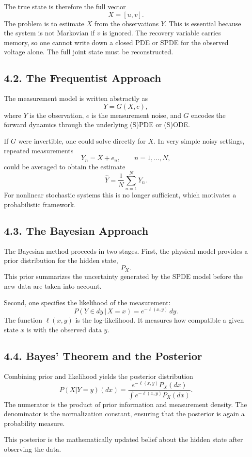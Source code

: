 \documentclass[11pt]{article}
\theoremstyle{definition}
\theoremstyle{remark}
\begin{document}
The true state is therefore the full vector
\[
X=[u,v].
\]
The problem is to estimate \(X\) from the observations \(Y\). This is essential because the system is not Markovian if \(v\) is ignored. The recovery variable carries memory, so one cannot write down a closed PDE or SPDE for the observed voltage alone. The full joint state must be reconstructed.

\subsection*{4.2. The Frequentist Approach}
The measurement model is written abstractly as
\[
Y=G(X,e),
\]
where \(Y\) is the observation, \(e\) is the measurement noise, and \(G\) encodes the forward dynamics through the underlying (S)PDE or (S)ODE.

If \(G\) were invertible, one could solve directly for \(X\). In very simple noisy settings, repeated measurements
\[
Y_n=X+e_n,
\qquad n=1,\dots,N,
\]
could be averaged to obtain the estimate
\[
\widehat Y=\frac1N\sum_{n=1}^N Y_n.
\]
For nonlinear stochastic systems this is no longer sufficient, which motivates a probabilistic framework.

\subsection*{4.3. The Bayesian Approach}
The Bayesian method proceeds in two stages. First, the physical model provides a prior distribution for the hidden state,
\[
P_X.
\]
This prior summarizes the uncertainty generated by the SPDE model before the new data are taken into account.

Second, one specifies the likelihood of the measurement:
\[
P(Y\in dy\,|\,X=x)=e^{-\ell(x,y)}\,dy.
\]
The function \(\ell(x,y)\) is the log-likelihood. It measures how compatible a given state \(x\) is with the observed data \(y\).

\subsection*{4.4. Bayes' Theorem and the Posterior}
Combining prior and likelihood yields the posterior distribution
\[
P(X|Y=y)(dx)
=
\frac{e^{-\ell(x,y)}P_X(dx)}
{\int e^{-\ell(x,y)}P_X(dx)}.
\]
The numerator is the product of prior information and measurement density. The denominator is the normalization constant, ensuring that the posterior is again a probability measure.

This posterior is the mathematically updated belief about the hidden state after observing the data.
\end{document}
